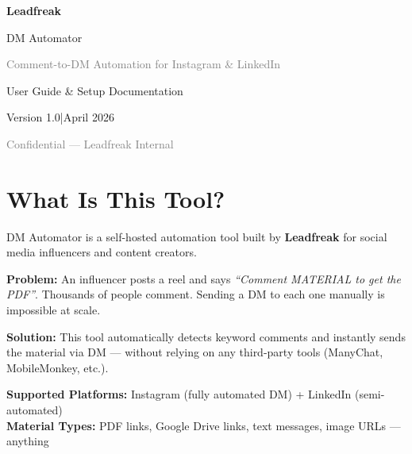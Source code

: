 \documentclass[12pt,a4paper]{article}
\begin{document}
\thispagestyle{empty}
\begin{center}
\vspace*{3cm}

{\fontsize{42}{48}\selectfont\bfseries\textcolor{dk}{Leadfreak}}

\vspace{0.6cm}
{\LARGE\textcolor{pri}{DM Automator}}

\vspace{0.3cm}
{\large\textcolor{gray}{Comment-to-DM Automation for Instagram \& LinkedIn}}

\vspace{2.5cm}

\begin{tcolorbox}[colback=blue!3, colframe=pri, boxrule=0.5pt, width=0.75\textwidth, halign=center]
{\large User Guide \& Setup Documentation}

\vspace{0.3cm}
Version 1.0\quad|\quad April 2026
\end{tcolorbox}

\vfill
{\small\textcolor{gray}{Confidential --- Leadfreak Internal}}
\end{center}
\newpage

\tableofcontents

\newpage
\section{What Is This Tool?}

DM Automator is a self-hosted automation tool built by \textbf{Leadfreak} for social media influencers and content creators.

\textbf{Problem:} An influencer posts a reel and says \textit{``Comment MATERIAL to get the PDF''}. Thousands of people comment. Sending a DM to each one manually is impossible at scale.

\textbf{Solution:} This tool automatically detects keyword comments and instantly sends the material via DM --- without relying on any third-party tools (ManyChat, MobileMonkey, etc.).

\begin{tcolorbox}[colback=blue!3, colframe=pri, boxrule=0.4pt]
\textbf{Supported Platforms:} Instagram (fully automated DM) + LinkedIn (semi-automated)\\[0.2em]
\textbf{Material Types:} PDF links, Google Drive links, text messages, image URLs --- anything
\end{tcolorbox}
\end{document}
